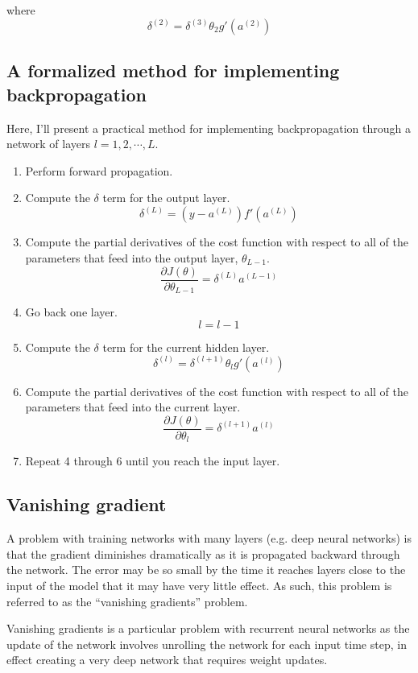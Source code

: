 \documentclass{article}
\begin{document}
where \[  \delta^{(2)} = \delta^{(3)} \theta_2 g'(a^{(2)}) \]


\subsection{A formalized method for implementing backpropagation}
Here, I'll present a practical method for implementing backpropagation through a network of layers $l=1,2,\cdots,L$.
\begin{enumerate}
\item Perform forward propagation.
\item Compute the $\delta$ term for the output layer.
\[ \delta^{(L)} = (y - a^{(L)}) f'(a^{(L)}) \]
\item Compute the partial derivatives of the cost function with respect to all of the parameters that feed into the output layer, $\theta_{L-1}$.
\[ \frac{\partial J(\theta)}{\partial \theta_{L-1}} =  \delta^{(L)} a^{(L-1)} \]
\item Go back one layer.
\[ l = l -1\]

\item Compute the $\delta$ term for the current hidden layer.
\[  \delta^{(l)} = \delta^{(l+1)} \theta_l g'(a^{(l)}) \]

\item Compute the partial derivatives of the cost function with respect to all of the parameters that feed into the current layer.
\[ \frac{\partial J(\theta)}{\partial \theta_{l}} =  \delta^{(l+1)} a^{(l)} \]
\item Repeat 4 through 6 until you reach the input layer.
\end{enumerate}



\subsection{Vanishing gradient}

A problem with training networks with many layers (e.g. deep neural networks) is that the gradient diminishes dramatically as it is propagated backward through the network. The error may be so small by the time it reaches layers close to the input of the model that it may have very little effect. As such, this problem is referred to as the ``vanishing gradients'' problem.

Vanishing gradients is a particular problem with recurrent neural networks as the update of the network involves unrolling the network for each input time step, in effect creating a very deep network that requires weight updates.
\end{document}
